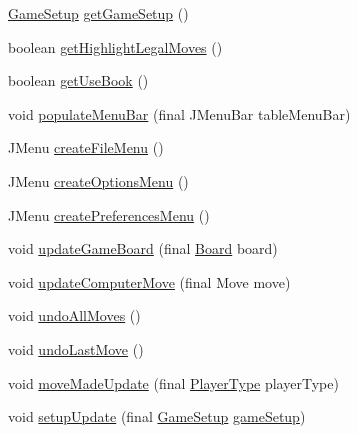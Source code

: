 \begin{DoxyCompactItemize}
\mbox{\hyperlink{classcom_1_1chess_1_1gui_1_1_game_setup}{Game\+Setup}} \mbox{\hyperlink{classcom_1_1chess_1_1gui_1_1_table_a51c93e55a8eca59d123b7422f923a5d9}{get\+Game\+Setup}} ()
\item 
boolean \mbox{\hyperlink{classcom_1_1chess_1_1gui_1_1_table_a96fab2f0e40f9c54dfac0d84bab604bd}{get\+Highlight\+Legal\+Moves}} ()
\item 
boolean \mbox{\hyperlink{classcom_1_1chess_1_1gui_1_1_table_a2c8b7c8f524006f6212e3c7cc4de6e9c}{get\+Use\+Book}} ()
\item 
void \mbox{\hyperlink{classcom_1_1chess_1_1gui_1_1_table_adb105659caa2f26c718e5dda66b7b8ee}{populate\+Menu\+Bar}} (final J\+Menu\+Bar table\+Menu\+Bar)
\item 
J\+Menu \mbox{\hyperlink{classcom_1_1chess_1_1gui_1_1_table_aa84ee991561ee679fda5d1e70b20c724}{create\+File\+Menu}} ()
\item 
J\+Menu \mbox{\hyperlink{classcom_1_1chess_1_1gui_1_1_table_aeaa46ff484884544176dc1c4357b56aa}{create\+Options\+Menu}} ()
\item 
J\+Menu \mbox{\hyperlink{classcom_1_1chess_1_1gui_1_1_table_a9805b9f47b5dfe8c648ba261c8f09a52}{create\+Preferences\+Menu}} ()
\item 
void \mbox{\hyperlink{classcom_1_1chess_1_1gui_1_1_table_abcfab35aa202adb449a74a5d5ea1e976}{update\+Game\+Board}} (final \mbox{\hyperlink{classcom_1_1chess_1_1engine_1_1classic_1_1board_1_1_board}{Board}} board)
\item 
void \mbox{\hyperlink{classcom_1_1chess_1_1gui_1_1_table_ab240e4ffcaa8c624489e4c04e1f0afb6}{update\+Computer\+Move}} (final Move move)
\item 
void \mbox{\hyperlink{classcom_1_1chess_1_1gui_1_1_table_ad71b48c7df08ab55563714edb9daf2bf}{undo\+All\+Moves}} ()
\item 
void \mbox{\hyperlink{classcom_1_1chess_1_1gui_1_1_table_aac815d0f878abbc8a11efd4be621f4e4}{undo\+Last\+Move}} ()
\item 
void \mbox{\hyperlink{classcom_1_1chess_1_1gui_1_1_table_a0dd8401d2bdbdf7cb5c285965e566d50}{move\+Made\+Update}} (final \mbox{\hyperlink{enumcom_1_1chess_1_1gui_1_1_table_1_1_player_type}{Player\+Type}} player\+Type)
\item 
void \mbox{\hyperlink{classcom_1_1chess_1_1gui_1_1_table_af4843c5ec101d41d4a3c8421904de603}{setup\+Update}} (final \mbox{\hyperlink{classcom_1_1chess_1_1gui_1_1_game_setup}{Game\+Setup}} \mbox{\hyperlink{classcom_1_1chess_1_1gui_1_1_table_adf23b1adc59603aad748c026ccbc23e3}{game\+Setup}})
\end{DoxyCompactItemize}
